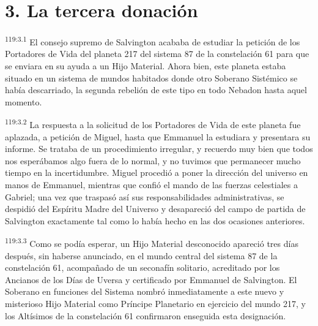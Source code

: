\section*{3. La tercera donación}
\par
\textsuperscript{119:3.1} El consejo supremo de Salvington acababa de estudiar la petición de los Portadores de Vida del planeta 217 del sistema 87 de la constelación 61 para que se enviara en su ayuda a un Hijo Material. Ahora bien, este planeta estaba situado en un sistema de mundos habitados donde otro Soberano Sistémico se había descarriado, la segunda rebelión de este tipo en todo Nebadon hasta aquel momento.

\par
\textsuperscript{119:3.2} La respuesta a la solicitud de los Portadores de Vida de este planeta fue aplazada, a petición de Miguel, hasta que Emmanuel la estudiara y presentara su informe. Se trataba de un procedimiento irregular, y recuerdo muy bien que todos nos esperábamos algo fuera de lo normal, y no tuvimos que permanecer mucho tiempo en la incertidumbre. Miguel procedió a poner la dirección del universo en manos de Emmanuel, mientras que confió el mando de las fuerzas celestiales a Gabriel; una vez que traspasó así sus responsabilidades administrativas, se despidió del Espíritu Madre del Universo y desapareció del campo de partida de Salvington exactamente tal como lo había hecho en las dos ocasiones anteriores.

\par
\textsuperscript{119:3.3} Como se podía esperar, un Hijo Material desconocido apareció tres días después, sin haberse anunciado, en el mundo central del sistema 87 de la constelación 61, acompañado de un seconafín solitario, acreditado por los Ancianos de los Días de Uversa y certificado por Emmanuel de Salvington. El Soberano en funciones del Sistema nombró inmediatamente a este nuevo y misterioso Hijo Material como Príncipe Planetario en ejercicio del mundo 217, y los Altísimos de la constelación 61 confirmaron enseguida esta designación.

